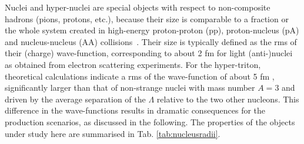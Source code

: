 \documentclass{appolb}
\begin{document}
Nuclei and hyper-nuclei are special objects with respect to non-composite hadrons (pions, protons, etc.), because their size is comparable to a fraction or the whole system created in high-energy proton-proton (pp), proton-nucleus (pA) and nucleus-nucleus (AA) collisions~\cite{Adam:2015vna}.  
Their size is typically defined as the rms of their (charge) wave-function, corresponding to about 2 fm for light (anti-)nuclei as obtained from electron scattering experiments. 
For the hyper-triton, theoretical calculations indicate a rms of the wave-function of about 5 fm \cite{Nemura:1999qp}, significantly larger than that of non-strange nuclei with mass number $A = 3$ and driven by the average separation of the $\Lambda$ relative to the two other nucleons. 
This difference in the wave-functions results in dramatic consequences for the production scenarios, as discussed in the following.
The properties of the objects under study here are summarised in Tab. \ref{tab:nucleusradii}.
\end{document}
